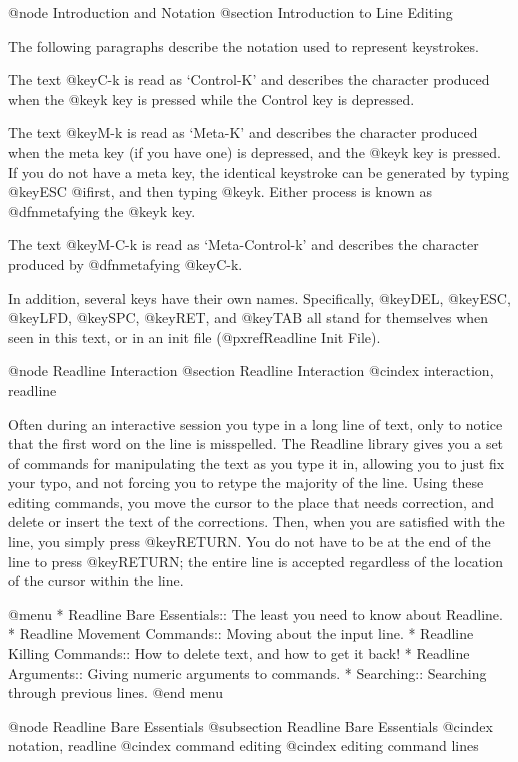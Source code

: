 @node Introduction and Notation
@section Introduction to Line Editing

The following paragraphs describe the notation used to represent
keystrokes.

The text @key{C-k} is read as `Control-K' and describes the character
produced when the @key{k} key is pressed while the Control key
is depressed.

The text @key{M-k} is read as `Meta-K' and describes the character
produced when the meta key (if you have one) is depressed, and the @key{k}
key is pressed.  If you do not have a meta key, the identical keystroke
can be generated by typing @key{ESC} @i{first}, and then typing @key{k}.
Either process is known as @dfn{metafying} the @key{k} key.

The text @key{M-C-k} is read as `Meta-Control-k' and describes the
character produced by @dfn{metafying} @key{C-k}.

In addition, several keys have their own names.  Specifically,
@key{DEL}, @key{ESC}, @key{LFD}, @key{SPC}, @key{RET}, and @key{TAB} all
stand for themselves when seen in this text, or in an init file
(@pxref{Readline Init File}).

@node Readline Interaction
@section Readline Interaction
@cindex interaction, readline

Often during an interactive session you type in a long line of text,
only to notice that the first word on the line is misspelled.  The
Readline library gives you a set of commands for manipulating the text
as you type it in, allowing you to just fix your typo, and not forcing
you to retype the majority of the line.  Using these editing commands,
you move the cursor to the place that needs correction, and delete or
insert the text of the corrections.  Then, when you are satisfied with
the line, you simply press @key{RETURN}.  You do not have to be at the
end of the line to press @key{RETURN}; the entire line is accepted
regardless of the location of the cursor within the line.

@menu
* Readline Bare Essentials::    The least you need to know about Readline.
* Readline Movement Commands::  Moving about the input line.
* Readline Killing Commands::   How to delete text, and how to get it back!
* Readline Arguments::          Giving numeric arguments to commands.
* Searching::                   Searching through previous lines.
 @end menu

@node Readline Bare Essentials
@subsection Readline Bare Essentials
@cindex notation, readline
@cindex command editing
@cindex editing command lines


